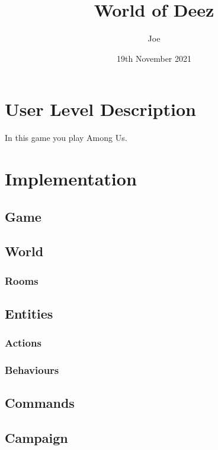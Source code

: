\documentclass{article}
\title{World of Deez}
\author{Joe}
\date{19th November 2021}
\begin{document}
\maketitle

    \begin{multicols}{2}
        \section{User Level Description}
        In this game you play Among Us.

        \section{Implementation}
        
            \subsection{Game}
            
            \subsection{World}
            
                \subsubsection{Rooms}
            
            \subsection{Entities}
            
                \subsubsection{Actions}
                
                \subsubsection{Behaviours}
            
            \subsection{Commands}
            
            \subsection{Campaign}


\end{multicols}
\end{document}
